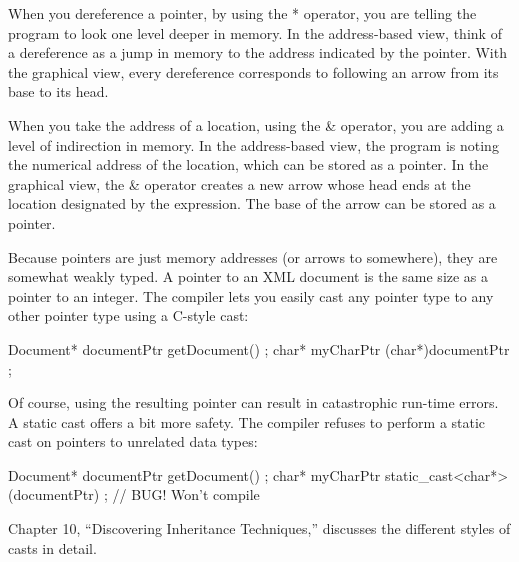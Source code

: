 When you dereference a pointer, by using the * operator, you are telling the program to look one level deeper in memory. In the address-based view, think of a dereference as a jump in memory to the address indicated by the pointer. With the graphical view, every dereference corresponds to following an arrow from its base to its head.

When you take the address of a location, using the \& operator, you are adding a level of indirection in memory. In the address-based view, the program is noting the numerical address of the location, which can be stored as a pointer. In the graphical view, the \& operator creates a new arrow whose head ends at the location designated by the expression. The base of the arrow can be stored as a pointer.


Because pointers are just memory addresses (or arrows to somewhere), they are somewhat weakly typed. A pointer to an XML document is the same size as a pointer to an integer. The compiler lets you easily cast any pointer type to any other pointer type using a C-style cast:

\begin{cpp}
Document* documentPtr { getDocument() };
char* myCharPtr { (char*)documentPtr };
\end{cpp}

Of course, using the resulting pointer can result in catastrophic run-time errors. A static cast offers a bit more safety. The compiler refuses to perform a static cast on pointers to unrelated data types:

\begin{cpp}
Document* documentPtr { getDocument() };
char* myCharPtr { static_cast<char*>(documentPtr) }; // BUG! Won't compile
\end{cpp}

Chapter 10, “Discovering Inheritance Techniques,” discusses the different styles of casts in detail.














